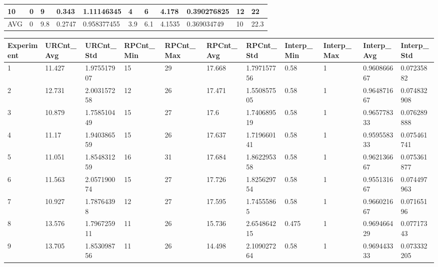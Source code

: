 \begin{table}[H]
\begin{adjustbox}{max width=380pt,keepaspectratio,angle=90}
\begin{tabular}{|l|l|l|l|l|l|l|l|l|l|l|}
					10         & 0         & 9         & 0.343     & 1.11146345  & 4            & 6            & 4.178        & 0.390276825  & 12         & 22         \\ \hline
					AVG        & 0         & 9.8       & 0.2747    & 0.958377455 & 3.9          & 6.1          & 4.1535       & 0.369034749  & 10         & 22.3       \\ \hline
				\end{tabular}	
			\end{adjustbox}
			\begin{adjustbox}{max width=380pt,keepaspectratio,angle=90}
				\begin{tabular}{|l|l|l|l|l|l|l|l|l|l|l|}
					\hline
					\rowcolor[HTML]{EFEFEF} 
					Experiment & URCnt\_Avg & URCnt\_Std  & RPCnt\_Min & RPCnt\_Max & RPCnt\_Avg & RPCnt\_Std  & Interp\_Min & Interp\_Max & Interp\_Avg & Interp\_Std \\ \hline
					1          & 11.427     & 1.975517907 & 15         & 29         & 17.668     & 1.797157756 & 0.58        & 1           & 0.960866667 & 0.07235882  \\ \hline
					2          & 12.731     & 2.003157258 & 12         & 26         & 17.471     & 1.550857505 & 0.58        & 1           & 0.964871667 & 0.074832908 \\ \hline
					3          & 10.879     & 1.758510449 & 15         & 27         & 17.6       & 1.740689519 & 0.58        & 1           & 0.965778333 & 0.076289888 \\ \hline
					4          & 11.17      & 1.940386559 & 15         & 26         & 17.637     & 1.719660141 & 0.58        & 1           & 0.959558333 & 0.075461741 \\ \hline
					5          & 11.051     & 1.854831259 & 16         & 31         & 17.684     & 1.862295358 & 0.58        & 1           & 0.962136667 & 0.075361877 \\ \hline
					6          & 11.563     & 2.057190074 & 15         & 27         & 17.726     & 1.825629754 & 0.58        & 1           & 0.955131667 & 0.074497963 \\ \hline
					7          & 10.927     & 1.78764398  & 12         & 27         & 17.595     & 1.74555865  & 0.58        & 1           & 0.966021667 & 0.07165196  \\ \hline
					8          & 13.576     & 1.796725911 & 11         & 26         & 15.736     & 2.654864215 & 0.475       & 1           & 0.969466429 & 0.07717343  \\ \hline
					9          & 13.705     & 1.853098756 & 11         & 26         & 14.498     & 2.109027264 & 0.58        & 1           & 0.969443333 & 0.073332205 \\ \hline

\end{tabular}
\end{adjustbox}
\end{table}

